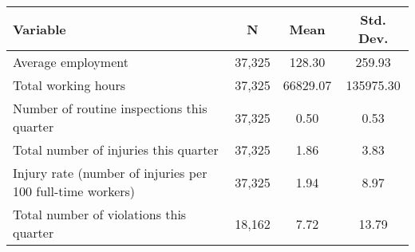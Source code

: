 \begin{tabular}{lccc}
\hline
Variable & N     & Mean  & Std. Dev. \bigstrut\\
\hline
Average employment &        37,325  & 128.30 & 259.93 \bigstrut[t]\\
Total working hours &        37,325  & 66829.07 & 135975.30 \\
Number of routine inspections this quarter &        37,325  & 0.50  & 0.53 \\
Total number of injuries this quarter &        37,325  & 1.86  & 3.83 \\
Injury rate (number of injuries per 100 full-time workers) &        37,325  & 1.94  & 8.97 \\
Total number of violations this quarter &        18,162  & 7.72  & 13.79 \bigstrut[b]\\
\hline
\end{tabular}%